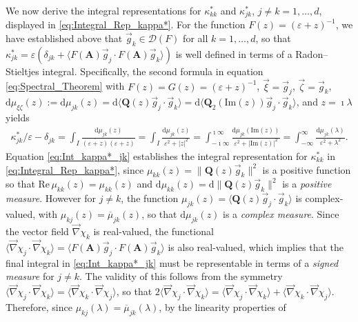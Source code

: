 \documentclass[11pt]{amsart}
\renewcommand{\d}{\mathrm{d}}
\newcommand{\Ab}{\mathbf{A}}
\newcommand{\Qb}{\mathbf{Q}}
\newcommand{\Ds}{\mathscr{D}}
\begin{document}
We now derive the integral representations for $\kappa^*_{kk}$ and
$\kappa^*_{jk}$, $j\neq k=1,\ldots,d$, displayed in
\eqref{eq:Integral_Rep_kappa*}. For the function $F(z)=(\varepsilon+z)^{-1}$, we
have established above that $\vec{g}_k\in\Ds(F)$ for all
$k=1,\ldots,d$, so that
$\kappa^*_{jk}=\varepsilon(\delta_{jk}+\langle F(\Ab)\vec{g}_j\cdot F(\Ab)\vec{g}_k\rangle)$ is well defined
in terms of a Radon--Stieltjes integral. Specifically, the second
formula in equation \eqref{eq:Spectral_Theorem} with
$F(z)=G(z)=(\varepsilon+z)^{-1}$, $\vec{\xi}=\vec{g}_j$, $\vec{\zeta}=\vec{g}_k$,
$\d\mu_{\xi\zeta}(z):=\d\mu_{jk}(z)=\d\langle\Qb(z)\vec{g}_j\cdot\vec{g}_k\rangle
=\d\langle\Qb_2(\text{Im}(z))\vec{g}_j\cdot\vec{g}_k\rangle$, and $z=\imath\lambda$
yields         
%
\begin{align}\label{eq:Int_kappa*_jk}
  \kappa^*_{jk}/\varepsilon-\delta_{jk}
               =\int_I\frac{\d\mu_{jk}(z)}{\overline{(\varepsilon+z)}(\varepsilon+z)}
               =\int_I\frac{\d\mu_{jk}(z)}{\varepsilon^2+|z|^2}
               =\int_{-\imath\infty}^{\imath\infty}\frac{\d\mu_{jk}(\text{Im}(z))}{\varepsilon^2+|\text{Im}(z)|^2}
               =\int_{-\infty}^\infty\frac{\d\mu_{jk}(\lambda)}{\varepsilon^2+\lambda^2}.
\end{align}
%
Equation \eqref{eq:Int_kappa*_jk} establishes the integral
representation for $\kappa^*_{kk}$ in \eqref{eq:Integral_Rep_kappa*}, since
$\mu_{kk}(z)=\|\Qb(z)\vec{g}_k\|^2$ is a positive function so that
$\text{Re}\,\mu_{kk}(z)=\mu_{kk}(z)$ and
$\d\mu_{kk}(z)=\d\|\Qb(z)\vec{g}_k\|^2$ is a \emph{positive 
  measure}. However for $j\neq k$, the function
$\mu_{jk}(z)=\langle\Qb(z)\vec{g}_j\cdot\vec{g}_k\rangle$ is complex-valued, with    
$\mu_{kj}(z)=\overline{\mu}_{jk}(z)$, so that $\d\mu_{jk}(z)$ is a
\emph{complex measure}. Since the vector field $\vec{\nabla}\chi_k$ is
real-valued, the 
functional $\langle\vec{\nabla}\chi_j\cdot\vec{\nabla}\chi_k\rangle=\langle F(\Ab)\vec{g}_j\cdot F(\Ab)\vec{g}_k\rangle$
is also real-valued, which implies that the final integral in
\eqref{eq:Int_kappa*_jk} must be representable in terms of a
\emph{signed measure} for $j\neq k$. The validity of this follows from the
symmetry $\langle\vec{\nabla}\chi_j\cdot\vec{\nabla}\chi_k\rangle=\langle\vec{\nabla}\chi_k\cdot\vec{\nabla}\chi_j\rangle$, so that
$2\langle\vec{\nabla}\chi_j\cdot\vec{\nabla}\chi_k\rangle=\langle\vec{\nabla}\chi_j\cdot\vec{\nabla}\chi_k\rangle+\langle\vec{\nabla}\chi_k\cdot\vec{\nabla}\chi_j\rangle$. Therefore, since
$\mu_{kj}(\lambda)=\overline{\mu}_{jk}(\lambda)$, by the linearity properties of
\end{document}

